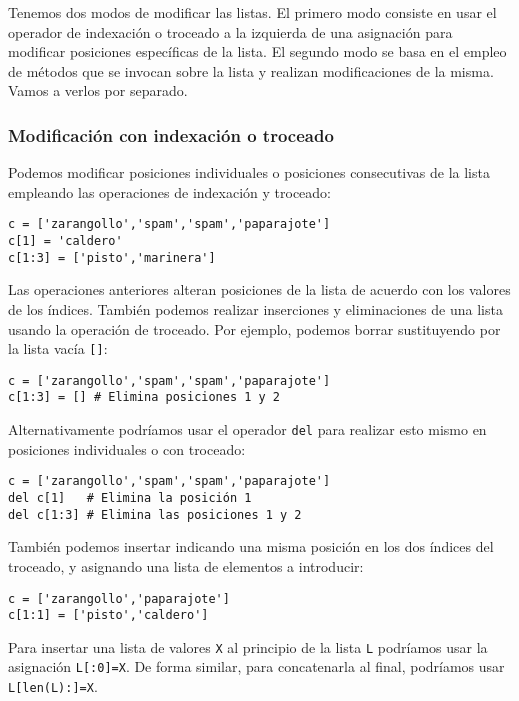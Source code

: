 Tenemos dos modos de modificar las listas. El primero modo consiste en usar el operador de indexación o troceado a la izquierda de una asignación para modificar posiciones específicas de la lista. El segundo modo se basa en el empleo de métodos que se invocan sobre la lista y realizan modificaciones de la misma. Vamos a verlos por separado.

\subsubsection{Modificación con indexación o troceado}

Podemos modificar posiciones individuales o posiciones consecutivas de la lista empleando las operaciones de indexación y troceado:

\begin{lstlisting}
c = ['zarangollo','spam','spam','paparajote']
c[1] = 'caldero' 
c[1:3] = ['pisto','marinera'] 
\end{lstlisting}

Las operaciones anteriores alteran posiciones de la lista de acuerdo con los valores de los índices. También podemos realizar inserciones y eliminaciones de una lista usando la operación de troceado. Por ejemplo, podemos borrar sustituyendo por la lista vacía \texttt{[]}:

\begin{lstlisting}
c = ['zarangollo','spam','spam','paparajote']
c[1:3] = [] # Elimina posiciones 1 y 2
\end{lstlisting}

Alternativamente podríamos usar el operador \texttt{del} para realizar esto mismo en posiciones individuales o con troceado:

\begin{lstlisting}
c = ['zarangollo','spam','spam','paparajote']
del c[1]   # Elimina la posición 1
del c[1:3] # Elimina las posiciones 1 y 2
\end{lstlisting}

También podemos insertar indicando una misma posición en los dos índices del troceado, y asignando una lista de elementos a introducir:

\begin{lstlisting}
c = ['zarangollo','paparajote']
c[1:1] = ['pisto','caldero']  
\end{lstlisting}

Para insertar una lista de valores \texttt{X} al principio de la lista \texttt{L} podríamos usar la asignación \texttt{L[:0]=X}. De forma similar, para concatenarla al final, podríamos usar \texttt{L[len(L):]=X}.


